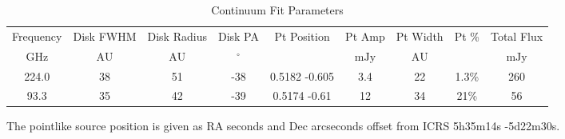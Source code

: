 \begin{table*}[htp]
\centering
\caption{Continuum Fit Parameters}
\begin{tabular}{ccccccccc}
\label{tab:continuum_fit_parameters}
Frequency & Disk FWHM & Disk Radius & Disk PA & Pt Position & Pt Amp & Pt Width & Pt \% & Total Flux \\
$\mathrm{GHz}$ & $\mathrm{AU}$ & $\mathrm{AU}$ & $\mathrm{{}^{\circ}}$ &  & $\mathrm{mJy}$ & $\mathrm{AU}$ & $\mathrm{}$ & $\mathrm{mJy}$ \\
\hline
224.0 & 38 & 51 & -38 & 0.5182 -0.605 & 3.4 & 22 & 1.3\% & 260 \\
93.3 & 35 & 42 & -39 & 0.5174 -0.61 & 12 & 34 & 21\% & 56 \\
\hline
\end{tabular}

\par The pointlike source position is given as RA seconds and Dec arcseconds offset from ICRS 5h35m14s -5d22m30s.
\end{table*}

